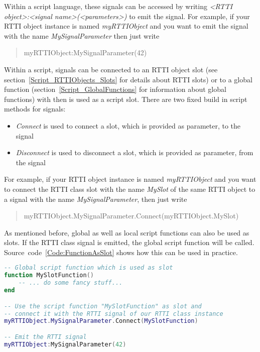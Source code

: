 Within a script language, these signals can be accessed by writing \emph{<RTTI object>:<signal name>(<parameters>)} to emit the signal. For example, if your \ac{RTTI} object instance is named \emph{myRTTIObject} and you want to emit the signal with the name \emph{MySignalParameter} then just write \begin{quote}myRTTIObject:MySignalParameter(42)\end{quote}

Within a script, signals can be connected to an \ac{RTTI} object slot (see section~\ref{Script_RTTIObjects_Slots} for details about \ac{RTTI} slots) or to a global function (section~\ref{Script_GlobalFunctions} for information about global functions) with then is used as a script slot. There are two fixed build in script methods for signals:
\begin{itemize}
\item{\emph{Connect} is used to connect a slot, which is provided as parameter, to the signal}
\item{\emph{Disconnect} is used to disconnect a slot, which is provided as parameter, from the signal}
\end{itemize}

For example, if your \ac{RTTI} object instance is named \emph{myRTTIObject} and you want to connect the \ac{RTTI} class slot with the name \emph{MySlot} of the same \ac{RTTI} object to a signal with the name \emph{MySignalParameter}, then just write \begin{quote}myRTTIObject.MySignalParameter.Connect(myRTTIObject.MySlot)\end{quote}

As mentioned before, global as well as local script functions can also be used as slots. If the \ac{RTTI} class signal is emitted, the global script function will be called. Source~code~\ref{Code:FunctionAsSlot} shows how this can be used in practice.
\begin{lstlisting}[language=lua,float=htb,label=Code:FunctionAsSlot,caption={Function as slot}]
-- Global script function which is used as slot
function MySlotFunction()
	-- ... do some fancy stuff...
end

-- Use the script function "MySlotFunction" as slot and
-- connect it with the RTTI signal of our RTTI class instance
myRTTIObject.MySignalParameter.Connect(MySlotFunction)

-- Emit the RTTI signal
myRTTIObject:MySignalParameter(42)
\end{lstlisting}


